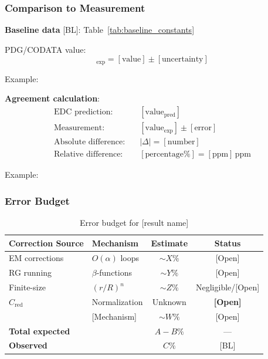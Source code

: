 
\subsubsection{Comparison to Measurement}

\textbf{Baseline data} [BL]: Table~\ref{tab:baseline_constants}

PDG/CODATA value:
\begin{equation}
  [\text{quantity}]_{\text{exp}} = [\text{value}] \pm [\text{uncertainty}]
\end{equation}

Example:

\textbf{Agreement calculation}:
\begin{align}
\text{EDC prediction:} \quad &[\text{value}_{\text{pred}}] \\
\text{Measurement:} \quad &[\text{value}_{\text{exp}}] \pm [\text{error}] \\
\text{Absolute difference:} \quad &|\Delta| = [\text{number}] \\
\text{Relative difference:} \quad &[\text{percentage}\%] = [\text{ppm}]\,\text{ppm}
\end{align}

Example:


\subsubsection{Error Budget}

\begin{table}[h]
\centering
\begin{tabular}{llcc}
\hline
\textbf{Correction Source} & \textbf{Mechanism} & \textbf{Estimate} & \textbf{Status} \\
\hline
EM corrections & $O(\alpha)$ loops & $\sim X\%$ & [Open] \\
RG running & $\beta$-functions & $\sim Y\%$ & [Open] \\
Finite-size & $(r/R)^n$ & $\sim Z\%$ & Negligible/[Open] \\
$C_{\mathrm{red}}$ & Normalization & Unknown & \textbf{[Open]} \\
[Other] & [Mechanism] & $\sim W\%$ & [Open] \\
\hline
\textbf{Total expected} & & \textbf{$A{-}B\%$} & — \\
\textbf{Observed} & & \textbf{$C\%$} & [BL] \\
\hline
\end{tabular}
\caption{Error budget for [result name]}
\label{tab:error_budget_[result]}
\end{table}

